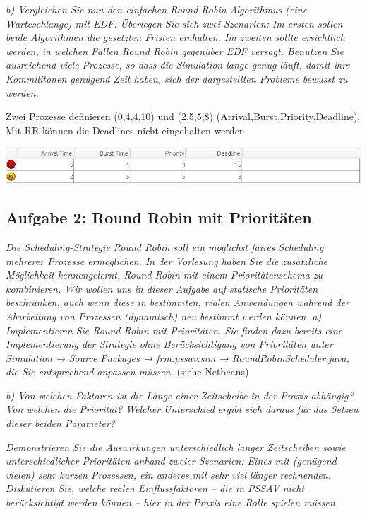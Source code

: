 \documentclass[a4paper]{article}
\begin{document}
\textit{b) Vergleichen Sie nun den einfachen Round-Robin-Algorithmus (eine Warteschlange) mit EDF. Überlegen Sie sich zwei Szenarien: Im ersten sollen beide Algorithmen die gesetzten Fristen einhalten. Im zweiten sollte ersichtlich werden, in welchen Fällen Round Robin gegenüber EDF versagt.
    Benutzen Sie ausreichend viele Prozesse, so dass die Simulation lange genug läuft, damit ihre Kommilitonen genügend Zeit haben, sich der dargestellten Probleme bewusst zu werden.}
\vspace{10mm}

Zwei Prozesse definieren (0,4,4,10) und (2,5,5,8) (Arrival,Burst,Priority,Deadline). Mit RR können die Deadlines nicht eingehalten werden.
\begin{center}
    \includegraphics[width=0.8\linewidth]{Assets/Betriebssysteme_uebung/u3_a1.png}
\end{center}

\subsection{Aufgabe 2: Round Robin mit Prioritäten}
\textit{Die Scheduling-Strategie Round Robin soll ein möglichst faires Scheduling mehrerer Prozesse ermöglichen. In der Vorlesung haben Sie die zusätzliche Möglichkeit kennengelernt, Round Robin mit einem Prioritätenschema zu kombinieren. Wir wollen uns in dieser Aufgabe auf statische Prioritäten beschränken, auch wenn diese in bestimmten, realen Anwendungen während der Abarbeitung von Prozessen (dynamisch) neu bestimmt werden können.}
\vspace{10mm}
\textit{a) Implementieren Sie Round Robin mit Prioritäten. Sie finden dazu bereits eine Implementierung der Strategie ohne Berücksichtigung von Prioritäten unter Simulation → Source Packages → frm.pssav.sim → RoundRobinScheduler.java, die Sie entsprechend anpassen müssen.}
\vspace{10mm}
(siehe Netbeans)

\textit{b) Von welchen Faktoren ist die Länge einer Zeitscheibe in der Praxis abhängig? Von welchen die Priorität? Welcher Unterschied ergibt sich daraus für das Setzen dieser beiden Parameter?}
\vspace{10mm}

\textit{Demonstrieren Sie die Auswirkungen unterschiedlich langer Zeitscheiben sowie unterschiedlicher Prioritäten anhand zweier Szenarien: Eines mit (genügend vielen) sehr kurzen Prozessen, ein anderes mit sehr viel länger rechnenden. Diskutieren Sie, welche realen Einflussfaktoren – die in PSSAV nicht berücksichtigt werden können – hier in der Praxis eine Rolle spielen müssen.}
\end{document}
